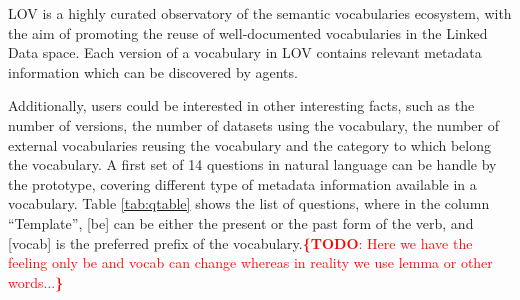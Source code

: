 \documentclass[runningheads,a4paper]{llncs}
\newcommand{\todo}[1]{\noindent\textcolor{red}{{\bf \{TODO}: #1{\bf \}}}}
\begin{document}
LOV is a highly curated observatory of the semantic vocabularies ecosystem, with the aim of promoting the reuse of well-documented vocabularies in the Linked Data space. Each version of a vocabulary in LOV contains relevant metadata information which can be discovered by agents. 

Additionally, users could be interested in other interesting facts, such as the number of versions, the number of datasets  using the vocabulary, the number of external vocabularies reusing the vocabulary and the category to which belong the vocabulary. A first set of 14 questions in natural language can be handle by the prototype, covering different type of metadata information available in a vocabulary. Table \ref{tab:qtable} shows the list of questions, where in the column ``Template'', [be] can be either the present or the past form of the verb, and [vocab] is the preferred prefix of the vocabulary.\todo{Here we have the feeling only be and vocab can change whereas in reality we use lemma or other words...}    
\end{document}
